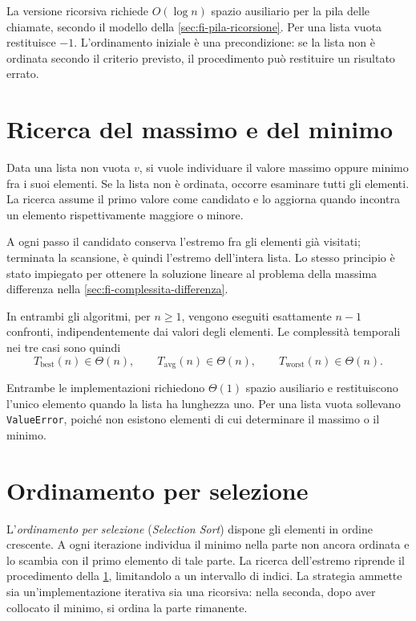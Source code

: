 La versione ricorsiva richiede \(O(\log n)\) spazio ausiliario
per la pila delle chiamate, secondo il modello della
\cref{sec:fi-pila-ricorsione}. Per una lista vuota restituisce
\(-1\). L'ordinamento iniziale è una precondizione: se la lista
non è ordinata secondo il criterio previsto, il procedimento
può restituire un risultato errato.

\clearpage

\section{Ricerca del massimo e del minimo}
\label{sec:fi-ricerca-estremi}

Data una lista non vuota \(v\), si vuole individuare il valore
massimo oppure minimo fra i suoi elementi. Se la lista non è
ordinata, occorre esaminare tutti gli elementi. La ricerca assume
il primo valore come candidato e lo aggiorna quando incontra un
elemento rispettivamente maggiore o minore.



A ogni passo il candidato conserva l'estremo fra gli elementi
già visitati; terminata la scansione, è quindi l'estremo
dell'intera lista. Lo stesso principio è stato impiegato per
ottenere la soluzione lineare al problema della massima differenza
nella \cref{sec:fi-complessita-differenza}.

In entrambi gli algoritmi, per \(n\ge1\), vengono eseguiti
esattamente \(n-1\) confronti, indipendentemente dai valori
degli elementi. Le complessità temporali nei tre casi sono quindi
\[
  T_{\mathrm{best}}(n)\in\Theta(n),\qquad
  T_{\mathrm{avg}}(n)\in\Theta(n),\qquad
  T_{\mathrm{worst}}(n)\in\Theta(n).
\]

Entrambe le implementazioni richiedono \(\Theta(1)\) spazio
ausiliario e restituiscono l'unico elemento quando la lista
ha lunghezza uno. Per una lista vuota sollevano
\texttt{ValueError}, poiché non esistono elementi di cui
determinare il massimo o il minimo.

\section{Ordinamento per selezione}
\label{sec:fi-ordinamento-selezione}

L'\emph{ordinamento per selezione} (\emph{Selection Sort}) dispone
gli elementi in ordine crescente. A ogni iterazione individua il
minimo nella parte non ancora ordinata e lo scambia con il primo
elemento di tale parte. La ricerca dell'estremo riprende il
procedimento della \cref{sec:fi-ricerca-estremi}, limitandolo a un
intervallo di indici. La strategia ammette sia un'implementazione
iterativa sia una ricorsiva: nella seconda, dopo aver collocato
il minimo, si ordina la parte rimanente.

